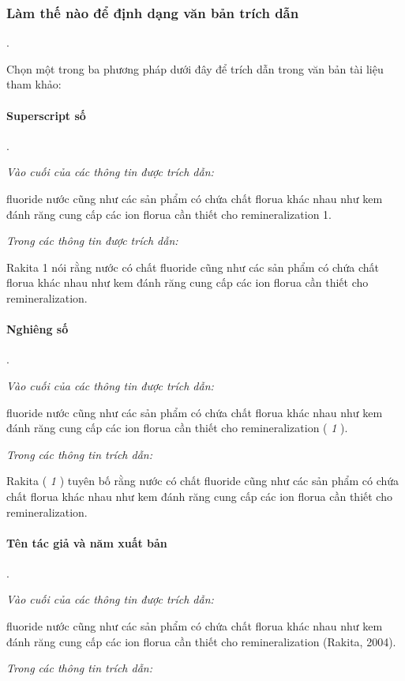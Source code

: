 \documentclass{hcmutarticle}
\begin{document}
\subsubsection{Làm thế nào để định dạng văn bản trích dẫn}.

Chọn một trong ba phương pháp dưới đây để trích dẫn trong văn bản tài liệu tham khảo:

\paragraph{Superscript số}.

{\em Vào cuối của các thông tin được trích dẫn:}

fluoride nước cũng như các sản phẩm có chứa chất florua khác nhau như kem đánh răng cung cấp các ion florua cần thiết cho remineralization 1.

{\em Trong các thông tin được trích dẫn:}

Rakita 1 nói rằng nước có chất fluoride cũng như các sản phẩm có chứa chất florua khác nhau như kem đánh răng cung cấp các ion florua cần thiết cho remineralization.


\paragraph{Nghiêng số}.

{\em Vào cuối của các thông tin được trích dẫn:}

fluoride nước cũng như các sản phẩm có chứa chất florua khác nhau như kem đánh răng cung cấp các ion florua cần thiết cho remineralization ( {\itshape 1} ).

{\em Trong các thông tin trích dẫn:}

Rakita ( {\itshape 1} ) tuyên bố rằng nước có chất fluoride cũng như các sản phẩm có chứa chất florua khác nhau như kem đánh răng cung cấp các ion florua cần thiết cho remineralization.


\paragraph{Tên tác giả và năm xuất bản}.

{\em Vào cuối của các thông tin được trích dẫn:}

fluoride nước cũng như các sản phẩm có chứa chất florua khác nhau như kem đánh răng cung cấp các ion florua cần thiết cho remineralization (Rakita, 2004).

{\em Trong các thông tin trích dẫn:}
\end{document}
